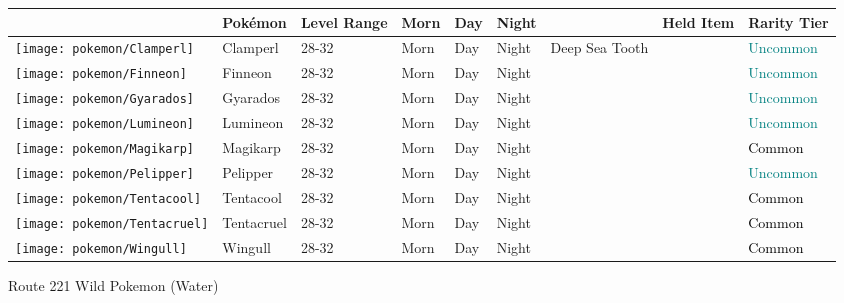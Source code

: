 \begin{longtable}{||l l l l l l l l l||}%
\hline%
&Pokémon&Level Range&Morn&Day&Night&&Held Item&Rarity Tier\\%
\hline%
\endhead%
\hline%
\texttt{[image: pokemon/Clamperl]}&Clamperl&28{-}32&Morn&Day&Night&Deep Sea Tooth&&\textcolor{teal}{%
Uncommon%
}\\%
\hline%
\texttt{[image: pokemon/Finneon]}&Finneon&28{-}32&Morn&Day&Night&&&\textcolor{teal}{%
Uncommon%
}\\%
\hline%
\texttt{[image: pokemon/Gyarados]}&Gyarados&28{-}32&Morn&Day&Night&&&\textcolor{teal}{%
Uncommon%
}\\%
\hline%
\texttt{[image: pokemon/Lumineon]}&Lumineon&28{-}32&Morn&Day&Night&&&\textcolor{teal}{%
Uncommon%
}\\%
\hline%
\texttt{[image: pokemon/Magikarp]}&Magikarp&28{-}32&Morn&Day&Night&&&\textcolor{black}{%
Common%
}\\%
\hline%
\texttt{[image: pokemon/Pelipper]}&Pelipper&28{-}32&Morn&Day&Night&&&\textcolor{teal}{%
Uncommon%
}\\%
\hline%
\texttt{[image: pokemon/Tentacool]}&Tentacool&28{-}32&Morn&Day&Night&&&\textcolor{black}{%
Common%
}\\%
\hline%
\texttt{[image: pokemon/Tentacruel]}&Tentacruel&28{-}32&Morn&Day&Night&&&\textcolor{black}{%
Common%
}\\%
\hline%
\texttt{[image: pokemon/Wingull]}&Wingull&28{-}32&Morn&Day&Night&&&\textcolor{black}{%
Common%
}\\%
\hline%
\end{longtable}%
\caption{Route 221 Wild Pokemon (Water)}